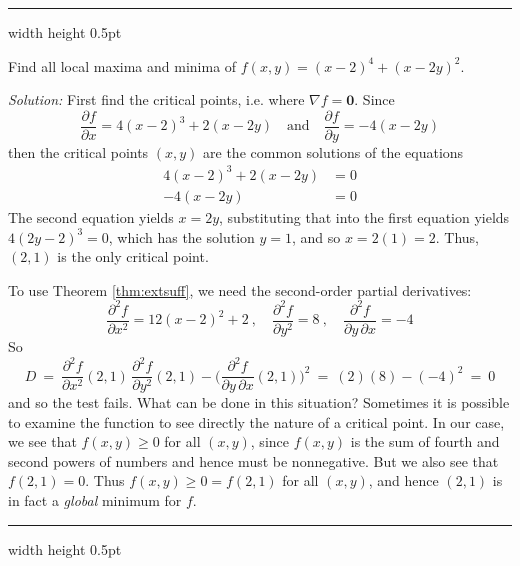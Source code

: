 \hrule width \textwidth height 0.5pt
\begin{exmp}\label{exmp:globalmin}
 Find all local maxima and minima of $f(x,y) = (x-2)^4 + (x-2y)^2$.\vspace{1mm}
 \par\noindent\emph{Solution:} First find the critical points, i.e. where $\nabla f = \textbf{0}$. Since
 \begin{displaymath}
  \frac{\partial f}{\partial x} = 4(x-2)^3 + 2(x-2y) \quad \text{and} \quad \frac{\partial f}{\partial y} = -4(x-2y)
 \end{displaymath}
 then the critical points $(x,y)$ are the common solutions of the equations
 \begin{align*}
  4(x-2)^3 + 2(x-2y) &= 0\\
  -4(x-2y) &= 0
 \end{align*}
 The second equation yields $x=2y$, substituting that into the first equation yields $4(2y-2)^3 = 0$, which has
 the solution $y=1$, and so $x =2(1) = 2$. Thus, $(2,1)$ is the only critical point.
 
 To use Theorem \ref{thm:extsuff}, we need the second-order partial derivatives:
 \begin{displaymath}
  \frac{\partial^2 f}{\partial x^2} = 12(x-2)^2 + 2 ~,\quad \frac{\partial^2 f}{\partial y^2} = 8 ~,\quad
  \dfrac{\partial^2 f}{\partial y \, \partial x} = -4
 \end{displaymath}
\newpage
\noindent So
 \begin{displaymath}
  D ~=~ \dfrac{\partial^2 f}{\partial x^2}(2,1) \, \dfrac{\partial^2 f}{\partial y^2}(2,1) -
 \biggl( \dfrac{\partial^2 f}{\partial y \, \partial x}(2,1) \biggr)^2 ~=~ (2)(8) - (-4)^2 ~=~ 0
 \end{displaymath}
 and so the test fails. What can be done in this situation? Sometimes it is possible to examine the function to see
 directly the nature of a critical point. In our case, we see that $f(x,y) \ge 0$ for all $(x,y)$, since $f(x,y)$ is
 the sum of fourth and second powers of numbers and hence must be nonnegative. But we also see that $f(2,1) = 0$.
 Thus $f(x,y) \ge 0 = f(2,1)$ for all $(x,y)$, and hence $(2,1)$ is in fact a \emph{global} minimum for $f$.
\end{exmp}
\hrule width \textwidth height 0.5pt

